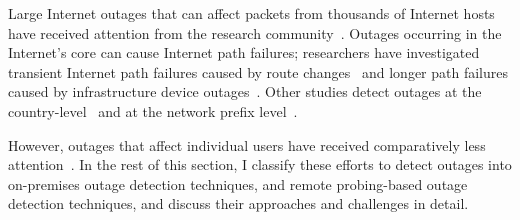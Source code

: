 
Large Internet outages that can affect packets from
thousands of Internet hosts have received attention from the research
community~\cite{censorship-outages, trinocular, hubble, paxson-e2e,
  hubble, netdiagnoser, lifeguard,
  poiroot, phillipa-outages-mailing-list,
  california-fault-lines, delayed-routing-convergence, consensus-routing,
  routing-e2e-path-perf, voip-bgp-convergence}. Outages occurring in the Internet's core can cause Internet
path failures; researchers have
investigated transient Internet path failures caused by route
changes~\cite{delayed-routing-convergence, consensus-routing,
  routing-e2e-path-perf, voip-bgp-convergence} and longer path failures caused by
infrastructure device outages~\cite{paxson-e2e,
  hubble, netdiagnoser, lifeguard,
  poiroot, phillipa-outages-mailing-list,
  california-fault-lines}. Other studies detect outages at the
country-level~\cite{censorship-outages} and at the network prefix
level~\cite{trinocular, hubble}.

However, outages that affect individual users have received comparatively less
attention~\cite{pingin, samknows, ripe-atlas-website,
  grover2013peeking}. In the rest of this
section, I classify these efforts to detect outages into on-premises
outage detection techniques, and remote probing-based outage detection
techniques, and
discuss their approaches and challenges in detail.





